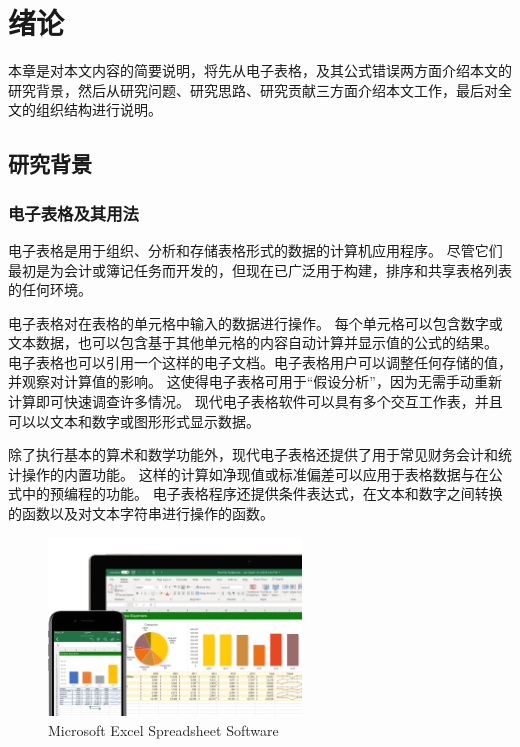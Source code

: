 \chapter{绪论}\label{introduction}

本章是对本文内容的简要说明，将先从电子表格，及其公式错误两方面介绍本文的研究背景，然后从研究问题、研究思路、研究贡献三方面介绍本文工作，最后对全文的组织结构进行说明。

\section{研究背景}

\subsection{电子表格及其用法}
电子表格是用于组织、分析和存储表格形式的数据的计算机应用程序。
尽管它们最初是为会计或簿记任务而开发的，但现在已广泛用于构建，排序和共享表格列表的任何环境。

电子表格对在表格的单元格中输入的数据进行操作。
每个单元格可以包含数字或文本数据，也可以包含基于其他单元格的内容自动计算并显示值的公式的结果。
电子表格也可以引用一个这样的电子文档。电子表格用户可以调整任何存储的值，并观察对计算值的影响。
这使得电子表格可用于“假设分析”，因为无需手动重新计算即可快速调查许多情况。
现代电子表格软件可以具有多个交互工作表，并且可以以文本和数字或图形形式显示数据。

除了执行基本的算术和数学功能外，现代电子表格还提供了用于常见财务会计和统计操作的内置功能。
这样的计算如净现值或标准偏差可以应用于表格数据与在公式中的预编程的功能。
电子表格程序还提供条件表达式，在文本和数字之间转换的函数以及对文本字符串进行操作的函数。

\begin{figure}[t!]
    \centering
    \includegraphics[width=0.6\textwidth]{figures/figure1.png}
    \caption{Microsoft Excel Spreadsheet Software}   
    \label{fig:1} 
\end{figure}

